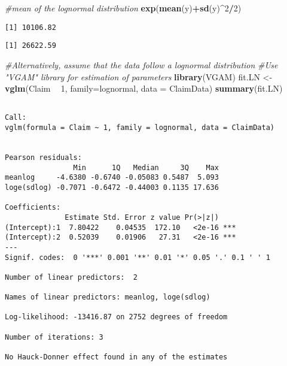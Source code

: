 \documentclass[]{book}
\newenvironment{Shaded}{\begin{snugshade}}{\end{snugshade}}
\newcommand{\KeywordTok}[1]{\textcolor[rgb]{0.13,0.29,0.53}{\textbf{#1}}}
\newcommand{\DataTypeTok}[1]{\textcolor[rgb]{0.13,0.29,0.53}{#1}}
\newcommand{\DecValTok}[1]{\textcolor[rgb]{0.00,0.00,0.81}{#1}}
\newcommand{\StringTok}[1]{\textcolor[rgb]{0.31,0.60,0.02}{#1}}
\newcommand{\CommentTok}[1]{\textcolor[rgb]{0.56,0.35,0.01}{\textit{#1}}}
\newcommand{\OperatorTok}[1]{\textcolor[rgb]{0.81,0.36,0.00}{\textbf{#1}}}
\newcommand{\NormalTok}[1]{#1}
\theoremstyle{definition}
\theoremstyle{definition}
\theoremstyle{definition}
\theoremstyle{remark}
\begin{document}
\begin{Shaded}
\begin{Highlighting}[]
\CommentTok{#mean of the lognormal distribution}
\KeywordTok{exp}\NormalTok{(}\KeywordTok{mean}\NormalTok{(y)}\OperatorTok{+}\KeywordTok{sd}\NormalTok{(y)}\OperatorTok{^}\DecValTok{2}\OperatorTok{/}\DecValTok{2}\NormalTok{)}
\end{Highlighting}
\end{Shaded}

\begin{verbatim}
[1] 10106.82
\end{verbatim}

\begin{Shaded}
\end{Shaded}

\begin{verbatim}
[1] 26622.59
\end{verbatim}

\begin{Shaded}
\begin{Highlighting}[]
\CommentTok{#Alternatively, assume that the data follow a lognormal distribution}
\CommentTok{#Use "VGAM" library for estimation of parameters }
\KeywordTok{library}\NormalTok{(VGAM)}
\NormalTok{fit.LN <-}\StringTok{ }\KeywordTok{vglm}\NormalTok{(Claim }\OperatorTok{~}\StringTok{ }\DecValTok{1}\NormalTok{, }\DataTypeTok{family=}\NormalTok{lognormal, }\DataTypeTok{data =}\NormalTok{ ClaimData)}
\KeywordTok{summary}\NormalTok{(fit.LN)}
\end{Highlighting}
\end{Shaded}

\begin{verbatim}

Call:
vglm(formula = Claim ~ 1, family = lognormal, data = ClaimData)


Pearson residuals:
                Min      1Q   Median     3Q    Max
meanlog     -4.6380 -0.6740 -0.05083 0.5487  5.093
loge(sdlog) -0.7071 -0.6472 -0.44003 0.1135 17.636

Coefficients: 
              Estimate Std. Error z value Pr(>|z|)    
(Intercept):1  7.80422    0.04535  172.10   <2e-16 ***
(Intercept):2  0.52039    0.01906   27.31   <2e-16 ***
---
Signif. codes:  0 '***' 0.001 '**' 0.01 '*' 0.05 '.' 0.1 ' ' 1

Number of linear predictors:  2 

Names of linear predictors: meanlog, loge(sdlog)

Log-likelihood: -13416.87 on 2752 degrees of freedom

Number of iterations: 3 

No Hauck-Donner effect found in any of the estimates
\end{verbatim}
\end{document}
